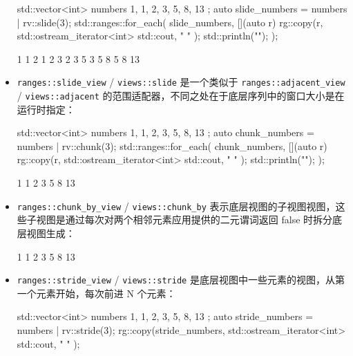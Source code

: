 \begin{itemize}
\begin{cpp}
std::vector<int> numbers{ 1, 1, 2, 3, 5, 8, 13 };
auto slide_numbers = numbers | rv::slide(3);
std::ranges::for_each(
    slide_numbers,
    [](auto r) {
        rg::copy(r, std::ostream_iterator<int>{ std::cout, " " });
        std::println("");
    });
\end{cpp}

\begin{shell}
1 1 2
1 2 3
2 3 5
3 5 8
5 8 13
\end{shell}

\item
\verb|ranges::slide_view| / \verb|views::slide| 是一个类似于 \verb|ranges::adjacent_view| / \verb|views::adjacent| 的范围适配器，不同之处在于底层序列中的窗口大小是在运行时指定：

\begin{cpp}
std::vector<int> numbers{ 1, 1, 2, 3, 5, 8, 13 };
auto chunk_numbers = numbers | rv::chunk(3);
std::ranges::for_each(
    chunk_numbers,
    [](auto r) {
        rg::copy(r, std::ostream_iterator<int>{ std::cout, " " });
        std::println("");
    });
\end{cpp}

\begin{shell}
1 1 2
3 5 8
13
\end{shell}

\item
\verb|ranges::chunk_by_view| / \verb|views::chunk_by| 表示底层视图的子视图视图，这些子视图是通过每次对两个相邻元素应用提供的二元谓词返回 false 时拆分底层视图生成：


\begin{shell}
1 1
2
3 5
8
13
\end{shell}

\item
\verb|ranges::stride_view| / \verb|views::stride| 是底层视图中一些元素的视图，从第一个元素开始，每次前进 N 个元素：

\begin{cpp}
std::vector<int> numbers{ 1, 1, 2, 3, 5, 8, 13 };
auto stride_numbers = numbers | rv::stride(3);
rg::copy(stride_numbers,
         std::ostream_iterator<int>{ std::cout, " " });
\end{cpp}


\end{itemize}
